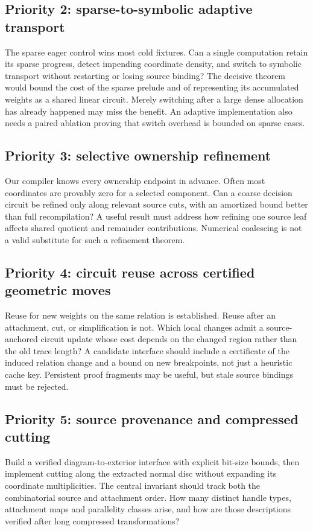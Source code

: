 \documentclass[11pt]{article}
\theoremstyle{definition}\newtheorem{definition}[theorem]{Definition}
\theoremstyle{remark}\newtheorem{remark}[theorem]{Remark}
\begin{document}
\subsection{Priority 2: sparse-to-symbolic adaptive transport}
The sparse eager control wins most cold fixtures. Can a single computation retain
its sparse progress, detect impending coordinate density, and switch to symbolic
transport without restarting or losing source binding? The decisive theorem would
bound the cost of the sparse prelude and of representing its accumulated weights
as a shared linear circuit. Merely switching after a large dense allocation has
already happened may miss the benefit. An adaptive implementation also needs a
paired ablation proving that switch overhead is bounded on sparse cases.

\subsection{Priority 3: selective ownership refinement}
Our compiler knows every ownership endpoint in advance. Often most coordinates
are provably zero for a selected component. Can a coarse decision circuit be
refined only along relevant source cuts, with an amortized bound better than full
recompilation? A useful result must address how refining one source leaf affects
shared quotient and remainder contributions. Numerical coalescing is not a valid
substitute for such a refinement theorem.

\subsection{Priority 4: circuit reuse across certified geometric moves}
Reuse for new weights on the same relation is established. Reuse after an
attachment, cut, or simplification is not. Which local changes admit a
source-anchored circuit update whose cost depends on the changed region rather
than the old trace length? A candidate interface should include a certificate of
the induced relation change and a bound on new breakpoints, not just a heuristic
cache key. Persistent proof fragments may be useful, but stale source bindings
must be rejected.

\subsection{Priority 5: source provenance and compressed cutting}
Build a verified diagram-to-exterior interface with explicit bit-size bounds,
then implement cutting along the extracted normal disc without expanding its
coordinate multiplicities. The central invariant should track both the
combinatorial source and attachment order. How many distinct handle types,
attachment maps and parallelity classes arise, and how are those descriptions
verified after long compressed transformations?
\end{document}
